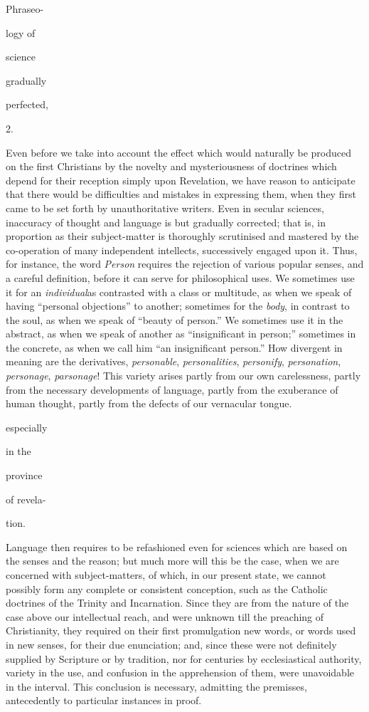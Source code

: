 Phraseo-

logy of

science

gradually

perfected,

2.

Even before we take into account the
effect which would naturally be produced on the first
Christians by the novelty and mysteriousness of doctrines
which depend for their reception simply upon Revelation, we
have reason to anticipate that there would be difficulties and
mistakes in expressing them, when they first came to be set
forth by unauthoritative writers. Even in secular sciences,
inaccuracy of thought and language is but gradually corrected;
that is, in proportion as their subject-matter is thoroughly
scrutinised and mastered by the co-operation of many
independent intellects, successively engaged upon it. Thus,
for instance, the word \emph{Person} requires the rejection of
various popular senses, and a careful definition, before it
can serve for philosophical uses. We sometimes use it for an \emph{individual}as contrasted with a class or multitude, as when we speak
of having ``personal objections'' to another; sometimes for the \emph{body},
in contrast to the soul, as when we speak of ``beauty of
person.'' We sometimes use it in the abstract, as when we speak
of another as ``insignificant in person;'' sometimes in the
concrete, as when we call him ``an insignificant person.'' How
divergent in meaning are the derivatives, \emph{personable}, \emph{personalities},
\emph{personify}, \emph{personation}, \emph{personage}, \emph{parsonage}!
This variety arises partly from our own carelessness,
partly from the necessary developments of language, partly
from the exuberance of human thought, partly from the defects
of our vernacular tongue.

especially

in the

province

of revela-

tion.

Language then requires to be refashioned
even for sciences which are based on the senses and the
reason; but much more will this be the case, when we are
concerned with subject-matters, of which, in our present
state, we cannot possibly form any complete or consistent
conception, such as the Catholic doctrines of the Trinity and
Incarnation. Since they are from the nature of the case above
our intellectual reach, and were unknown till the preaching of
Christianity, they required on their first promulgation new
words, or words used in new senses, for their due enunciation;
and, since these were not definitely supplied by Scripture or
by tradition, nor for centuries by ecclesiastical authority,
variety in the use, and confusion in the apprehension of them,
were unavoidable in the interval. This conclusion is
necessary, admitting the premisses, antecedently to particular
instances in proof.

